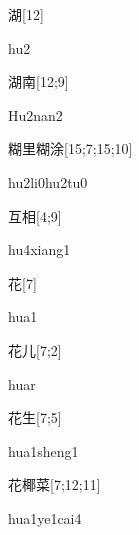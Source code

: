 \begin{verbete}[hu2]{湖}[12]
\begin{pronuncia}{hu2}
\end{pronuncia}
\end{verbete}

\begin{verbete}[Hu2nan2]{湖南}[12;9]
\begin{pronuncia}{Hu2nan2}
\end{pronuncia}
\end{verbete}

\begin{verbete}[hu2li0hu2tu0]{糊里糊涂}[15;7;15;10]
\begin{pronuncia}[\\]{hu2li0hu2tu0}
\end{pronuncia}
\end{verbete}

\begin{verbete}[hu4xiang1]{互相}[4;9]
\begin{pronuncia}{hu4xiang1}
\end{pronuncia}
\end{verbete}

\begin{verbete}[hua1]{花}[7]
\begin{pronuncia}{hua1}
\end{pronuncia}
\end{verbete}

\begin{verbete}[huar1]{花儿}[7;2]
\begin{pronuncia}{huar}
\end{pronuncia}
\end{verbete}

\begin{verbete}{花生}[7;5]
\begin{pronuncia}{hua1sheng1}
\end{pronuncia}
\end{verbete}

\begin{verbete}{花椰菜}[7;12;11]
\begin{pronuncia}{hua1ye1cai4}
\end{pronuncia}
\end{verbete}

